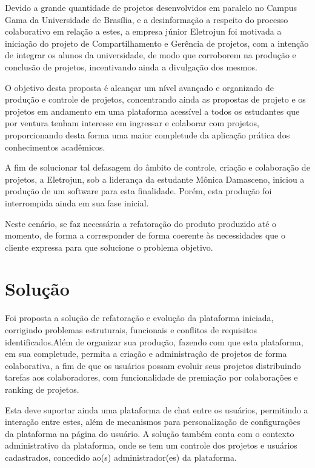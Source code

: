 Devido a grande quantidade de projetos desenvolvidos em paralelo no Campus Gama da Universidade de Brasília, e a desinformação a respeito do processo colaborativo em relação a estes, a empresa júnior Eletrojun foi motivada a iniciação do projeto de Compartilhamento e Gerência de projetos, com a intenção de integrar os alunos da universidade, de modo que corroborem na produção e conclusão de projetos, incentivando ainda a divulgação dos mesmos.

O objetivo desta proposta é alcançar um nível avançado e organizado de produção e controle de projetos, concentrando ainda as propostas de projeto e os projetos em andamento em uma plataforma acessível a todos os estudantes que por ventura tenham interesse em ingressar e colaborar com projetos, proporcionando desta forma uma maior completude da aplicação prática dos conhecimentos acadêmicos.

A fim de solucionar tal defasagem do âmbito de controle, criação e colaboração de projetos, a Eletrojun, sob a liderança da estudante Mônica Damasceno, iniciou a produção de um software para esta finalidade. Porém, esta produção foi interrompida ainda em sua fase inicial.

Neste cenário, se faz necessária a refatoração do produto produzido até o momento, de forma a corresponder de forma coerente às necessidades que o cliente expressa para que solucione o problema objetivo.

\section {Solução}

Foi proposta a solução de refatoração e evolução da plataforma iniciada, corrigindo problemas estruturais, funcionais e conflitos de requisitos identificados.Além de organizar sua produção, fazendo com que esta plataforma, em sua completude, permita a criação e administração de projetos de forma colaborativa, a fim de que os usuários possam evoluir seus projetos distribuindo tarefas aos colaboradores, com funcionalidade de premiação por colaborações e ranking de projetos.

Esta deve suportar ainda uma plataforma de chat entre os usuários, permitindo a interação entre estes, além de mecanismos para personalização de configurações da plataforma na página do usuário. A solução também conta com o contexto administrativo da plataforma, onde se tem um controle dos projetos e usuários cadastrados, concedido ao(s) administrador(es) da plataforma.
